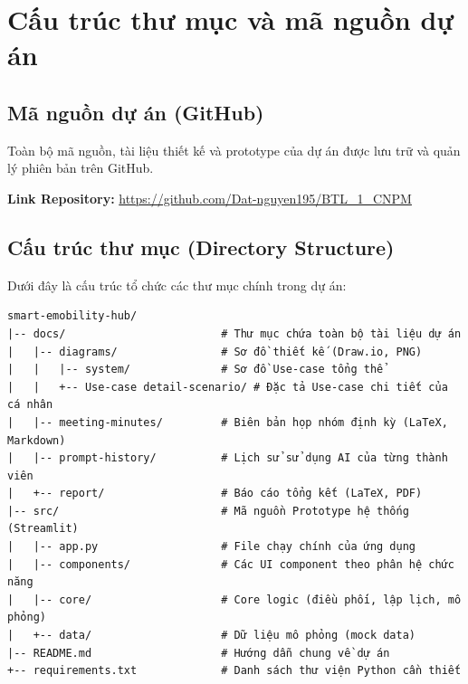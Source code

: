 \documentclass[12pt,a4paper]{report}
\begin{document}
\appendix
\chapter{Cấu trúc thư mục và mã nguồn dự án}

\section{Mã nguồn dự án (GitHub)}
Toàn bộ mã nguồn, tài liệu thiết kế và prototype của dự án được lưu trữ và quản lý phiên bản trên GitHub. 

\textbf{Link Repository:} \url{https://github.com/Dat-nguyen195/BTL_1_CNPM}

\section{Cấu trúc thư mục (Directory Structure)}
Dưới đây là cấu trúc tổ chức các thư mục chính trong dự án:

\begin{verbatim}
smart-emobility-hub/
|-- docs/                        # Thư mục chứa toàn bộ tài liệu dự án
|   |-- diagrams/                # Sơ đồ thiết kế (Draw.io, PNG)
|   |   |-- system/              # Sơ đồ Use-case tổng thể
|   |   +-- Use-case detail-scenario/ # Đặc tả Use-case chi tiết của cá nhân
|   |-- meeting-minutes/         # Biên bản họp nhóm định kỳ (LaTeX, Markdown)
|   |-- prompt-history/          # Lịch sử sử dụng AI của từng thành viên
|   +-- report/                  # Báo cáo tổng kết (LaTeX, PDF)
|-- src/                         # Mã nguồn Prototype hệ thống (Streamlit)
|   |-- app.py                   # File chạy chính của ứng dụng
|   |-- components/              # Các UI component theo phân hệ chức năng
|   |-- core/                    # Core logic (điều phối, lập lịch, mô phỏng)
|   +-- data/                    # Dữ liệu mô phỏng (mock data)
|-- README.md                    # Hướng dẫn chung về dự án
+-- requirements.txt             # Danh sách thư viện Python cần thiết
\end{verbatim}
\end{document}
